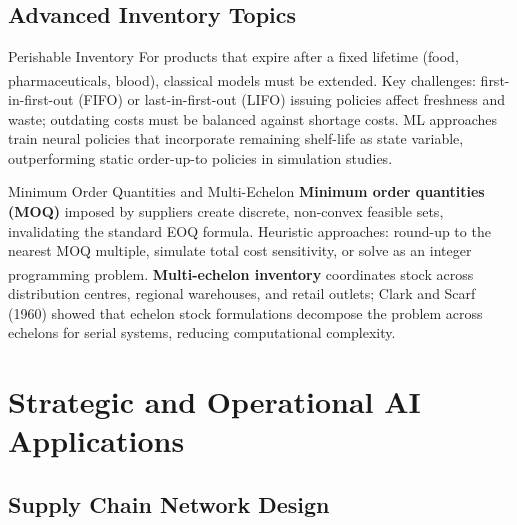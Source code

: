 \subsection{Advanced Inventory Topics}


\begin{v3topic}{Perishable Inventory}
    For products that expire after a fixed lifetime (food, pharmaceuticals, blood), classical models must be extended\textsuperscript{\cite{nahmiasOptimalOrderingPolicies1973}}.
    Key challenges: first-in-first-out (FIFO) or last-in-first-out (LIFO) issuing policies affect freshness and waste; outdating costs must be balanced against shortage costs.
    ML approaches train neural policies that incorporate remaining shelf-life as state variable, outperforming static order-up-to policies in simulation studies.

\end{v3topic}
\begin{v3topic}{Minimum Order Quantities and Multi-Echelon}
    \textbf{Minimum order quantities (MOQ)} imposed by suppliers create discrete, non-convex feasible sets, invalidating the standard EOQ formula.
    Heuristic approaches: round-up to the nearest MOQ multiple, simulate total cost sensitivity, or solve as an integer programming problem\textsuperscript{\cite[][pp.~210--215]{vandeputInventoryOptimization2020}}.
    \textbf{Multi-echelon inventory} coordinates stock across distribution centres, regional warehouses, and retail outlets; Clark and Scarf (1960) showed that echelon stock formulations decompose the problem across echelons for serial systems, reducing computational complexity.

\end{v3topic}

\section{Strategic and Operational AI Applications}

\subsection{Supply Chain Network Design}


